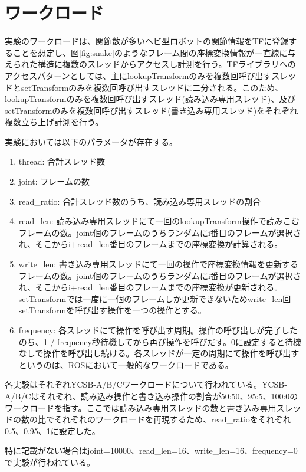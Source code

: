 \documentclass[a4paper]{jreport}	%
\begin{document}
\section{ワークロード}

実験のワークロードは、関節数が多いヘビ型ロボットの関節情報をTFに登録することを想定し、図\ref{fig:snake}のようなフレーム間の座標変換情報が一直線に与えられた構造に複数のスレッドからアクセスし計測を行う。TFライブラリへのアクセスパターンとしては、主にlookupTransformのみを複数回呼び出すスレッドとsetTransformのみを複数回呼び出すスレッドに二分される。このため、lookupTransformのみを複数回呼び出すスレッド(読み込み専用スレッド)、及びsetTransformのみを複数回呼び出すスレッド(書き込み専用スレッド)をそれぞれ複数立ち上げ計測を行う。

実験においては以下のパラメータが存在する。
\begin{enumerate}
  \item thread: 合計スレッド数
  \item joint: フレームの数
  \item read\_ratio: 合計スレッド数のうち、読み込み専用スレッドの割合
  \item read\_len: 読み込み専用スレッドにて一回のlookupTransform操作で読みこむフレームの数。joint個のフレームのうちランダムにi番目のフレームが選択され、そこからi+read\_len番目のフレームまでの座標変換が計算される。
  \item write\_len: 書き込み専用スレッドにて一回の操作で座標変換情報を更新するフレームの数。joint個のフレームのうちランダムにi番目のフレームが選択され、そこからi+read\_len番目のフレームまでの座標変換が更新される。setTransformでは一度に一個のフレームしか更新できないためwrite\_len回setTransformを呼び出す操作を一つの操作とする。
  \item frequency: 各スレッドにて操作を呼び出す周期。操作の呼び出しが完了したのち、1 / frequency秒待機してから再び操作を呼びだす。0に設定すると待機なしで操作を呼び出し続ける。各スレッドが一定の周期にて操作を呼び出すというのは、ROSにおいて一般的なワークロードである。
\end{enumerate}

各実験はそれぞれYCSB-A/B/C\cite{ycsb}ワークロードについて行われている。YCSB-A/B/Cはそれぞれ、読み込み操作と書き込み操作の割合が50:50、95:5、100:0のワークロードを指す。ここでは読み込み専用スレッドの数と書き込み専用スレッドの数の比でそれぞれのワークロードを再現するため、read\_ratioをそれぞれ0.5、0.95、1に設定した。

特に記載がない場合はjoint=10000、read\_len=16、write\_len=16、frequency=0で実験が行われている。
\end{document}
